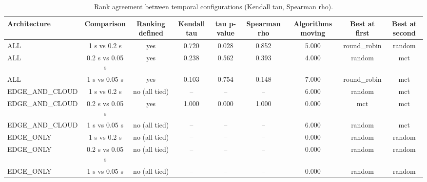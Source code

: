 \begin{table}
\centering
\scriptsize
\caption{Rank agreement between temporal configurations (Kendall tau, Spearman rho).}
\label{tab:p1-ranking-stability}
\begin{tabular}{lcccccccc}
\toprule
Architecture & Comparison & Ranking defined & Kendall tau & tau p-value & Spearman rho & Algorithms moving & Best at first & Best at second \\
\midrule
ALL & 1 s vs 0.2 s & yes & 0.720 & 0.028 & 0.852 & 5.000 & round\_robin & random \\
ALL & 0.2 s vs 0.05 s & yes & 0.238 & 0.562 & 0.393 & 4.000 & random & mct \\
ALL & 1 s vs 0.05 s & yes & 0.103 & 0.754 & 0.148 & 7.000 & round\_robin & mct \\
EDGE\_AND\_CLOUD & 1 s vs 0.2 s & no (all tied) & -- & -- & -- & 6.000 & random & mct \\
EDGE\_AND\_CLOUD & 0.2 s vs 0.05 s & yes & 1.000 & 0.000 & 1.000 & 0.000 & mct & mct \\
EDGE\_AND\_CLOUD & 1 s vs 0.05 s & no (all tied) & -- & -- & -- & 6.000 & random & mct \\
EDGE\_ONLY & 1 s vs 0.2 s & no (all tied) & -- & -- & -- & 0.000 & random & random \\
EDGE\_ONLY & 0.2 s vs 0.05 s & no (all tied) & -- & -- & -- & 0.000 & random & random \\
EDGE\_ONLY & 1 s vs 0.05 s & no (all tied) & -- & -- & -- & 0.000 & random & random \\
\bottomrule
\end{tabular}
\par\vspace{2pt}{\footnotesize\raggedright A tau below one means the simulator's temporal configuration changes the ordering of the algorithms; the last two columns give the winner at each end of the comparison. Where every algorithm produces the same outcome there is no ordering to agree on, and the correlation is left undefined rather than reported as one.\par}
\end{table}
